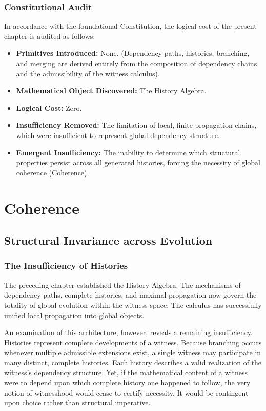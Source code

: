 \documentclass[12pt,anyside]{book}
\begin{document}
\subsection{Constitutional Audit}
In accordance with the foundational Constitution, the logical cost of the present chapter is audited as follows:
\begin{itemize}
    \item \textbf{Primitives Introduced:} None. (Dependency paths, histories, branching, and merging are derived entirely from the composition of dependency chains and the admissibility of the witness calculus).
    \item \textbf{Mathematical Object Discovered:} The History Algebra.
    \item \textbf{Logical Cost:} Zero.
    \item \textbf{Insufficiency Removed:} The limitation of local, finite propagation chains, which were insufficient to represent global dependency structure.
    \item \textbf{Emergent Insufficiency:} The inability to determine which structural properties persist across all generated histories, forcing the necessity of global coherence (Coherence).
\end{itemize}


\chapter{Coherence}
\setlength{\parindent}{0pt}

\section{Structural Invariance across Evolution}

\subsection{The Insufficiency of Histories}
The preceding chapter established the History Algebra. The mechanisms of dependency paths, complete histories, and maximal propagation now govern the totality of global evolution within the witness space. The calculus has successfully unified local propagation into global objects.

An examination of this architecture, however, reveals a remaining insufficiency. Histories represent complete developments of a witness. Because branching occurs whenever multiple admissible extensions exist, a single witness may participate in many distinct, complete histories. Each history describes a valid realization of the witness's dependency structure. Yet, if the mathematical content of a witness were to depend upon which complete history one happened to follow, the very notion of witnesshood would cease to certify necessity. It would be contingent upon choice rather than structural imperative.
\end{document}
